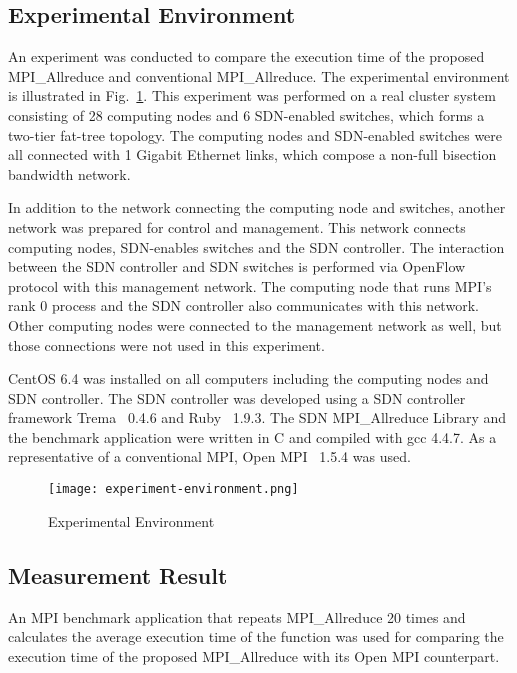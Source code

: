 \subsection{Experimental Environment}

An experiment was conducted to compare the execution time of the
proposed MPI\_Allreduce and conventional
MPI\_Allreduce. The experimental environment is illustrated in
Fig.~\ref{fig:experiment-environment}. This experiment was performed on
a real cluster system consisting of 28 computing nodes and 6 SDN-enabled
switches, which forms a two-tier fat-tree topology. The computing nodes
and SDN-enabled switches were all connected with 1 Gigabit Ethernet
links, which compose a non-full bisection bandwidth network.

In addition to the network connecting the computing node and switches,
another network was prepared for control and management. This network
connects computing nodes, SDN-enables switches and the SDN controller.
The interaction between the SDN controller and SDN switches is performed
via OpenFlow protocol with this management network. The computing node
that runs MPI's rank 0 process and the SDN controller also communicates
with this network. Other computing nodes were connected to the
management network as well, but those connections were not used in this
experiment.

CentOS 6.4 was installed on all computers including the computing nodes and
SDN controller. The SDN controller was developed using a SDN controller
framework Trema~\autocite{trema} 0.4.6 and Ruby~\autocite{ruby} 1.9.3. The SDN
MPI\_Allreduce Library and the benchmark application were written in C and
compiled with gcc 4.4.7. As a representative of a conventional MPI,
Open MPI~\autocite{Gabriel2004} 1.5.4 was used.

\begin{figure}
    \centering
    \texttt{[image: experiment-environment.png]}
    \caption{Experimental Environment}%
    \label{fig:experiment-environment}
\end{figure}

\subsection{Measurement Result}

An MPI benchmark application that repeats MPI\_Allreduce 20
times and calculates the average execution time of the function was used
for comparing the execution time of the proposed MPI\_Allreduce
with its Open MPI counterpart.

